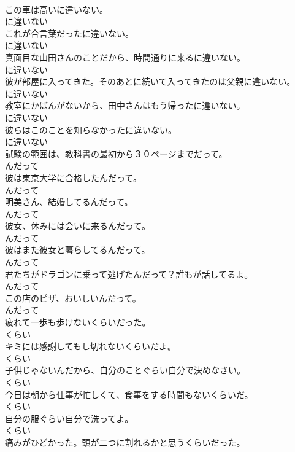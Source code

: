 \documentclass[8pt]{extreport}
\begin{document}
\begin{CJK}{UTF8}{min}
\\	この車は高いに違いない。	
\\	に違いない
\\	これが合言葉だったに違いない。	
\\	に違いない
\\	真面目な山田さんのことだから、時間通りに来るに違いない。	
\\	に違いない
\\	彼が部屋に入ってきた。そのあとに続いて入ってきたのは父親に違いない。	
\\	に違いない
\\	教室にかばんがないから、田中さんはもう帰ったに違いない。	
\\	に違いない
\\	彼らはこのことを知らなかったに違いない。	
\\	に違いない
\\	試験の範囲は、教科書の最初から３０ページまでだって。	
\\	んだって
\\	彼は東京大学に合格したんだって。	
\\	んだって
\\	明美さん、結婚してるんだって。	
\\	んだって
\\	彼女、休みには会いに来るんだって。	
\\	んだって
\\	彼はまた彼女と暮らしてるんだって。	
\\	んだって
\\	君たちがドラゴンに乗って逃げたんだって？誰もが話してるよ。	
\\	んだって
\\	この店のピザ、おいしいんだって。	
\\	んだって
\\	疲れて一歩も歩けないくらいだった。	
\\	くらい
\\	キミには感謝してもし切れないくらいだよ。	
\\	くらい
\\	子供じゃないんだから、自分のことぐらい自分で決めなさい。	
\\	くらい
\\	今日は朝から仕事が忙しくて、食事をする時間もないくらいだ。	
\\	くらい
\\	自分の服ぐらい自分で洗ってよ。	
\\	くらい
\\	痛みがひどかった。頭が二つに割れるかと思うくらいだった。	

\end{CJK}
\end{document}

